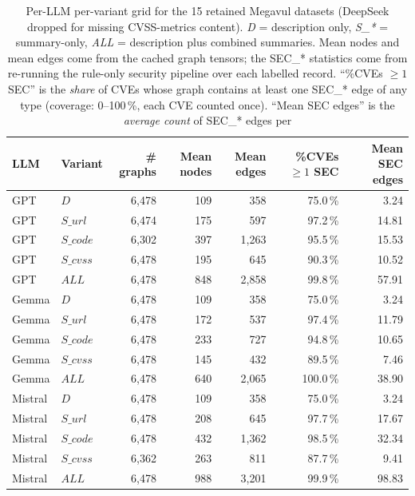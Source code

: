 \documentclass[11pt,a4paper]{article}
\begin{document}
\begin{table}[!htbp]
\centering\footnotesize
\setlength{\tabcolsep}{6pt}
\begin{tabular}{l l r r r r r}
\toprule
LLM & Variant & \# graphs & Mean nodes & Mean edges & \%CVEs $\geq 1$ SEC & Mean SEC edges \\
\midrule
GPT      & $D$       & 6{,}478 & 109 &   358 & 75.0\,\% &  3.24 \\
GPT      & $S\_url$  & 6{,}474 & 175 &   597 & 97.2\,\% & 14.81 \\
GPT      & $S\_code$ & 6{,}302 & 397 & 1{,}263 & 95.5\,\% & 15.53 \\
GPT      & $S\_cvss$ & 6{,}478 & 195 &   645 & 90.3\,\% & 10.52 \\
GPT      & $ALL$     & 6{,}478 & 848 & 2{,}858 & 99.8\,\% & 57.91 \\
\midrule
Gemma    & $D$       & 6{,}478 & 109 &   358 & 75.0\,\% &  3.24 \\
Gemma    & $S\_url$  & 6{,}478 & 172 &   537 & 97.4\,\% & 11.79 \\
Gemma    & $S\_code$ & 6{,}478 & 233 &   727 & 94.8\,\% & 10.65 \\
Gemma    & $S\_cvss$ & 6{,}478 & 145 &   432 & 89.5\,\% &  7.46 \\
Gemma    & $ALL$     & 6{,}478 & 640 & 2{,}065 & 100.0\,\% & 38.90 \\
\midrule
Mistral  & $D$       & 6{,}478 & 109 &   358 & 75.0\,\% &  3.24 \\
Mistral  & $S\_url$  & 6{,}478 & 208 &   645 & 97.7\,\% & 17.67 \\
Mistral  & $S\_code$ & 6{,}478 & 432 & 1{,}362 & 98.5\,\% & 32.34 \\
Mistral  & $S\_cvss$ & 6{,}362 & 263 &   811 & 87.7\,\% &  9.41 \\
Mistral  & $ALL$     & 6{,}478 & 988 & 3{,}201 & 99.9\,\% & 98.83 \\
\bottomrule
\end{tabular}
\caption{Per-LLM per-variant grid for the 15 retained
Megavul datasets (DeepSeek dropped for missing
CVSS-metrics content). \emph{D} = description only,
\emph{S\_*} = summary-only, \emph{ALL} = description
plus combined summaries. Mean nodes and mean edges come
from the cached graph tensors; the SEC\_* statistics
come from re-running the rule-only security pipeline
over each labelled record. ``\%CVEs $\geq 1$ SEC'' is
the \emph{share} of CVEs whose
graph contains at least one SEC\_* edge of any type
(coverage: 0--100\,\%, each CVE counted once). ``Mean SEC
edges'' is the \emph{average count} of SEC\_* edges per
}
\end{table}
\end{document}
